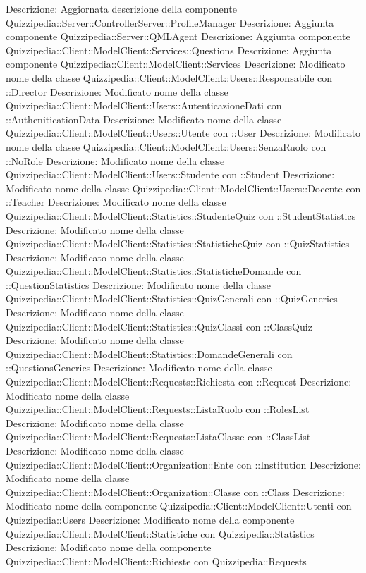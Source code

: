 Descrizione: Aggiornata descrizione della componente Quizzipedia::Server::ControllerServer::ProfileManager 
Descrizione: Aggiunta componente Quizzipedia::Server::QMLAgent 
Descrizione: Aggiunta componente Quizzipedia::Client::ModelClient::Services::Questions 
Descrizione: Aggiunta componente Quizzipedia::Client::ModelClient::Services 
Descrizione: Modificato nome della classe Quizzipedia::Client::ModelClient::Users::Responsabile con ::Director 
Descrizione: Modificato nome della classe Quizzipedia::Client::ModelClient::Users::AutenticazioneDati con ::AutheniticationData 
Descrizione: Modificato nome della classe Quizzipedia::Client::ModelClient::Users::Utente con ::User 
Descrizione: Modificato nome della classe Quizzipedia::Client::ModelClient::Users::SenzaRuolo con ::NoRole 
Descrizione: Modificato nome della classe Quizzipedia::Client::ModelClient::Users::Studente con ::Student 
Descrizione: Modificato nome della classe Quizzipedia::Client::ModelClient::Users::Docente con ::Teacher 
Descrizione: Modificato nome della classe Quizzipedia::Client::ModelClient::Statistics::StudenteQuiz con ::StudentStatistics 
Descrizione: Modificato nome della classe Quizzipedia::Client::ModelClient::Statistics::StatisticheQuiz con ::QuizStatistics 
Descrizione: Modificato nome della classe Quizzipedia::Client::ModelClient::Statistics::StatisticheDomande con ::QuestionStatistics 
Descrizione: Modificato nome della classe Quizzipedia::Client::ModelClient::Statistics::QuizGenerali con ::QuizGenerics 
Descrizione: Modificato nome della classe Quizzipedia::Client::ModelClient::Statistics::QuizClassi con ::ClassQuiz 
Descrizione: Modificato nome della classe Quizzipedia::Client::ModelClient::Statistics::DomandeGenerali con ::QuestionsGenerics 
Descrizione: Modificato nome della classe Quizzipedia::Client::ModelClient::Requests::Richiesta con ::Request 
Descrizione: Modificato nome della classe Quizzipedia::Client::ModelClient::Requests::ListaRuolo con ::RolesList 
Descrizione: Modificato nome della classe Quizzipedia::Client::ModelClient::Requests::ListaClasse con ::ClassList 
Descrizione: Modificato nome della classe Quizzipedia::Client::ModelClient::Organization::Ente con ::Institution 
Descrizione: Modificato nome della classe Quizzipedia::Client::ModelClient::Organization::Classe con ::Class 
Descrizione: Modificato nome della componente Quizzipedia::Client::ModelClient::Utenti con Quizzipedia::Users 
Descrizione: Modificato nome della componente Quizzipedia::Client::ModelClient::Statistiche con Quizzipedia::Statistics 
Descrizione: Modificato nome della componente Quizzipedia::Client::ModelClient::Richieste con Quizzipedia::Requests 
